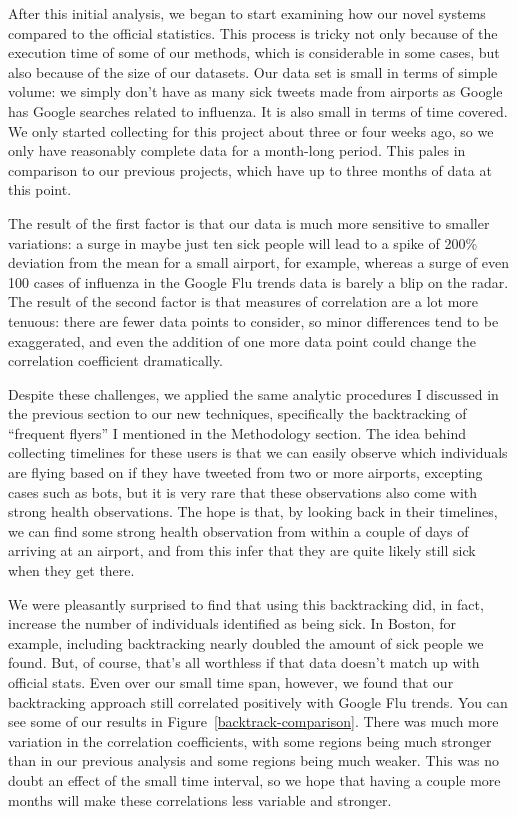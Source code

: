 \documentclass[11pt, letterpaper]{article}
\begin{document}
            After this initial analysis, we began to start examining how our novel systems compared to the official statistics. This process is tricky not only because of the execution time of some of our methods, which is considerable in some cases, but also because of the size of our datasets. Our data set is small in terms of simple volume: we simply don't have as many sick tweets made from airports as Google has Google searches related to influenza. It is also small in terms of time covered. We only started collecting for this project about three or four weeks ago, so we only have reasonably complete data for a month-long period. This pales in comparison to our previous projects, which have up to three months of data at this point.

            The result of the first factor is that our data is much more sensitive to smaller variations: a surge in maybe just ten sick people will lead to a spike of 200\% deviation from the mean for a small airport, for example, whereas a surge of even 100 cases of influenza in the Google Flu trends data is barely a blip on the radar. The result of the second factor is that measures of correlation are a lot more tenuous: there are fewer data points to consider, so minor differences tend to be exaggerated, and even the addition of one more data point could change the correlation coefficient dramatically.

            Despite these challenges, we applied the same analytic procedures I discussed in the previous section to our new techniques, specifically the backtracking of ``frequent flyers'' I mentioned in the Methodology section. The idea behind collecting timelines for these users is that we can easily observe which individuals are flying based on if they have tweeted from two or more airports, excepting cases such as bots, but it is very rare that these observations also come with strong health observations. The hope is that, by looking back in their timelines, we can find some strong health observation from within a couple of days of arriving at an airport, and from this infer that they are quite likely still sick when they get there.

            We were pleasantly surprised to find that using this backtracking did, in fact, increase the number of individuals identified as being sick. In Boston, for example, including backtracking nearly doubled the amount of sick people we found. But, of course, that's all worthless if that data doesn't match up with official stats. Even over our small time span, however, we found that our backtracking approach still correlated positively with Google Flu trends. You can see some of our results in Figure~\ref{backtrack-comparison}. There was much more variation in the correlation coefficients, with some regions being much stronger than in our previous analysis and some regions being much weaker. This was no doubt an effect of the small time interval, so we hope that having a couple more months will make these correlations less variable and stronger.
\end{document}
